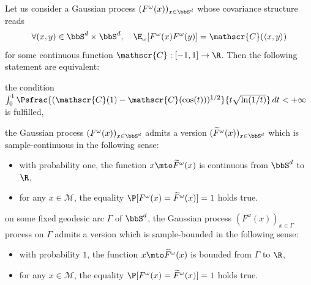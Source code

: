 \begin{prop}\label{casSd}
Let us consider a Gaussian process $(F^\omega(x))_{x\in \bbS^d}$ whose covariance structure reads
\begin{equation}\label{covSD}
\forall (x,y)\in \bbS^d\times \bbS^d, \quad \E_\omega[F^\omega(x) F^\omega(y)]=\mathscr{C}(\langle x, y\rangle)
\end{equation}
for some continuous function $\mathscr{C}:[-1,1]\to \R$. Then the following statement are equivalent:
\begin{enumeratei}
\item\label{casSdi} the condition $\int_{0}^{1} \Psfrac{(\mathscr{C}(1)-\mathscr{C}(\cos(t)))^{1/2}}{t\sqrt{\ln(1/t)}}\, dt<+\infty$ is fulfilled,
\item\label{casSdii} the Gaussian process $(F^\omega(x))_{x\in \bbS^d}$ admits a version $(\widetilde{F}^\omega(x))_{x\in \bbS^d}$ which is sample-continuous in the following sense:
\begin{itemize}
\item with probability one, the function $x\mto \widetilde{F}^{\omega}(x)$ is continuous from
$\bbS^d$ to $\R$,
\item for any $x\in \mathcal{M}$, the equality $\P[F^{\omega}(x)=\widetilde{F}^{\omega}(x)]=1$ holds true.
\end{itemize}
\item\label{casSdiii} on some fixed geodesic arc $\Gamma$ of $\bbS^d$, the Gaussian process $(F^\omega(x))_{x\in \Gamma}$ process on $\Gamma$ admits a version which is sample-bounded in the following sense:
\begin{itemize}
\item with probability $1$, the function $x \mto \widetilde{F}^{\omega}(x)$ is bounded from $\Gamma$ to $\R$,
\item for any $x\in \mathcal{M}$, the equality $\P[F^{\omega}(x)=\widetilde{F}^{\omega}(x)]=1$ holds true.
\end{itemize}
\end{enumeratei}
\end{prop}

